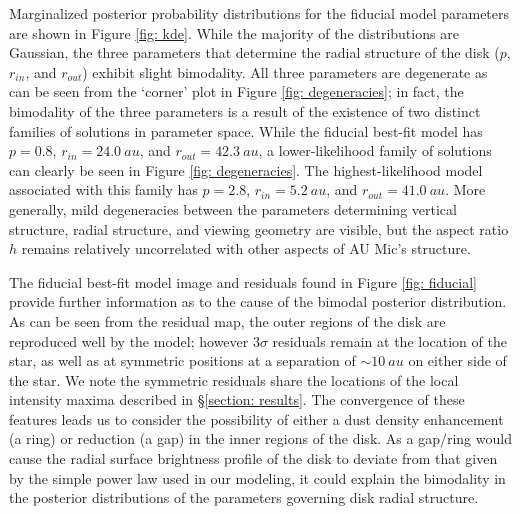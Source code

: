 \documentclass[modern]{aastex62}
\begin{document}
Marginalized posterior probability distributions for the fiducial model parameters are shown in Figure \ref{fig: kde}.
While the majority of the distributions are Gaussian, the three parameters that determine the radial structure of the disk ($p$, $r_{in}$, and $r_{out}$) exhibit slight bimodality. 
All three parameters are degenerate as can be seen from the `corner' plot in Figure \ref{fig: degeneracies}; in fact, the bimodality of the three parameters is a result of the existence of two distinct families of solutions in parameter space.
While the fiducial best-fit model has $p=0.8$, $r_{in}=\SI{24.0}{au}$, and $r_{out}=\SI{42.3}{au}$, a lower-likelihood family of solutions can clearly be seen in Figure \ref{fig: degeneracies}. The highest-likelihood model associated with this family has $p = 2.8$, $r_{in} = \SI{5.2}{au}$, and $r_{out} = \SI{41.0}{au}$.
More generally, mild degeneracies between the parameters determining vertical structure, radial  structure, and viewing geometry are visible, but the aspect ratio $h$ remains relatively uncorrelated with other aspects of AU Mic's structure.

The fiducial best-fit model image and residuals found in Figure \ref{fig: fiducial} provide further information as to the cause of the bimodal posterior distribution.
As can be seen from the residual map, the outer regions of the disk are reproduced well by the model; however $3\sigma$ residuals remain at the location of the star, as well as at symmetric positions at a separation of $\sim \SI{10}{au}$ on either side of the star. 
We note the symmetric residuals share the locations of the local intensity maxima described in \S \ref{section: results}. 
The convergence of these features leads us to consider the possibility of either a dust density enhancement (a ring) or reduction (a gap) in the inner regions of the disk. 
As a gap/ring would cause the radial surface brightness profile of the disk to deviate from that given by the simple power law used in our modeling, it could explain the bimodality in the posterior distributions of the parameters governing disk radial structure.
\end{document}
